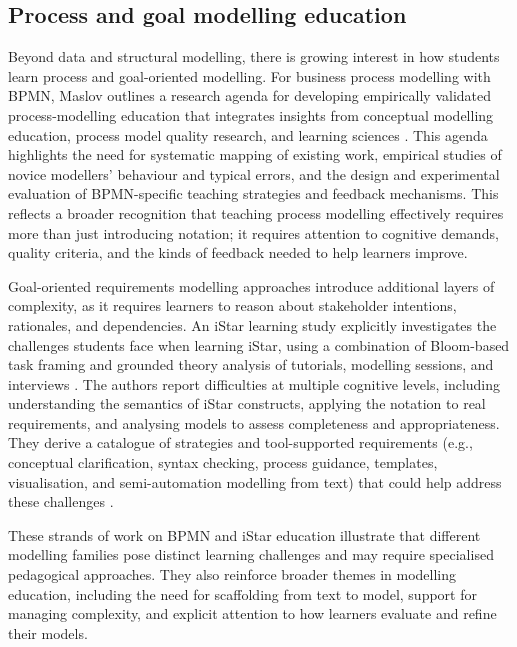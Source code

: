 \subsection{Process and goal modelling education}
\label{subsec:process_goal_modelling_education}

Beyond data and structural modelling, there is growing interest in how students learn process and goal-oriented modelling. For business process modelling with BPMN, Maslov outlines a research agenda for developing empirically validated process-modelling education that integrates insights from conceptual modelling education, process model quality research, and learning sciences \cite{bpmn-education}. This agenda highlights the need for systematic mapping of existing work, empirical studies of novice modellers' behaviour and typical errors, and the design and experimental evaluation of BPMN-specific teaching strategies and feedback mechanisms. This reflects a broader recognition that teaching process modelling effectively requires more than just introducing notation; it requires attention to cognitive demands, quality criteria, and the kinds of feedback needed to help learners improve.

Goal-oriented requirements modelling approaches introduce additional layers of complexity, as it requires learners to reason about stakeholder intentions, rationales, and dependencies. An iStar learning study explicitly investigates the challenges students face when learning iStar, using a combination of Bloom-based task framing and grounded theory analysis of tutorials, modelling sessions, and interviews \cite{istar-learning}. The authors report difficulties at multiple cognitive levels, including understanding the semantics of iStar constructs, applying the notation to real requirements, and analysing models to assess completeness and appropriateness. They derive a catalogue of strategies and tool-supported requirements (e.g., conceptual clarification, syntax checking, process guidance, templates, visualisation, and semi-automation modelling from text) that could help address these challenges \cite{istar-learning}.

These strands of work on BPMN and iStar education illustrate that different modelling families pose distinct learning challenges and may require specialised pedagogical approaches. They also reinforce broader themes in modelling education, including the need for scaffolding from text to model, support for managing complexity, and explicit attention to how learners evaluate and refine their models.

